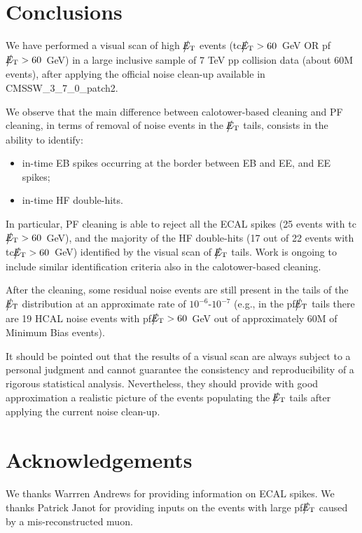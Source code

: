 \section{Conclusions}
We have performed a visual scan of high $\big\slash\hspace{-1.6ex}{E_\text{T}}$ events 
(tc$\big\slash\hspace{-1.6ex}{E_\text{T}}>60$~GeV OR pf$\big\slash\hspace{-1.6ex}{E_\text{T}}>60$~GeV)
in a large inclusive sample of 7 TeV pp collision data (about 60M events), 
after applying the official noise clean-up available in CMSSW\_3\_7\_0\_patch2.

We observe that the main difference between calotower-based cleaning and PF cleaning, in 
terms of removal of noise events in the $\big\slash\hspace{-1.6ex}{E_\text{T}}$ tails, consists in the ability to identify:
\begin{itemize}
\item in-time EB spikes occurring at the border between EB and EE, and EE spikes; 
\item in-time HF double-hits.
\end{itemize}

In particular, PF cleaning is able to reject all the ECAL spikes 
(25 events with tc$\big\slash\hspace{-1.6ex}{E_\text{T}}>60$~GeV), and the majority of the HF double-hits (17 out of 22 events with 
tc$\big\slash\hspace{-1.6ex}{E_\text{T}}>60$~GeV) identified by the visual scan of $\big\slash\hspace{-1.6ex}{E_\text{T}}$ tails.
Work is ongoing to include similar identification criteria also in the calotower-based cleaning.

After the cleaning, some residual noise events are still present in the tails 
of the $\big\slash\hspace{-1.6ex}{E_\text{T}}$ distribution at an approximate rate of $10^{-6}$-$10^{-7}$
(e.g., in the pf$\big\slash\hspace{-1.6ex}{E_\text{T}}$ tails there are 19 HCAL noise events with pf$\big\slash\hspace{-1.6ex}{E_\text{T}}>60$~GeV 
out of approximately 60M of Minimum Bias events).

It should be pointed out that the results of a visual scan 
are always subject to a personal judgment and cannot guarantee 
the consistency and reproducibility of a rigorous statistical analysis. 
Nevertheless, they should provide with good approximation a realistic 
picture of the events populating the $\big\slash\hspace{-1.6ex}{E_\text{T}}$ tails after applying 
the current noise clean-up.

\section{Acknowledgements}
We thanks Warrren Andrews for providing information on ECAL spikes.
We thanks Patrick Janot for providing inputs on the events with large pf$\big\slash\hspace{-1.6ex}{E_\text{T}}$ 
caused by a mis-reconstructed muon.

